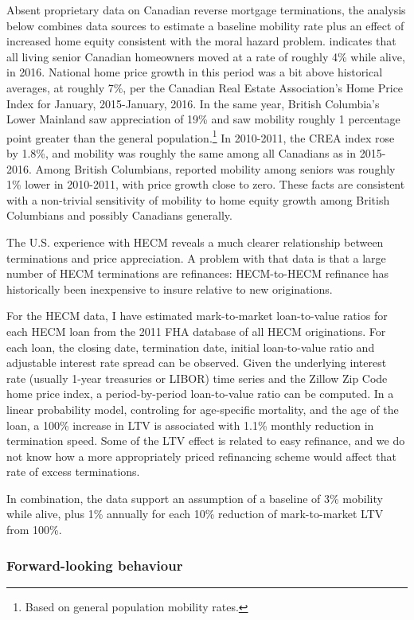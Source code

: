 \documentclass[12pt]{article}
\begin{document}
Absent proprietary data on Canadian reverse mortgage terminations, the analysis
below combines data sources to estimate a baseline mobility rate plus an effect
of increased home equity consistent with the moral hazard problem.
\textcite{HousingNeeds} indicates that all living senior Canadian homeowners
moved at a rate of roughly 4\% while alive, in 2016. National home price growth
in this period was a bit above historical averages, at roughly 7\%, per the
Canadian Real Estate Association's Home Price Index for January, 2015-January,
2016. In the same year, British Columbia's Lower Mainland saw appreciation of
19\% and saw mobility roughly 1 percentage point greater than the general
population.\footnote{Based on general population mobility rates.} In 2010-2011,
the CREA index rose by 1.8\%, and mobility was roughly the same among all
Canadians as in 2015-2016. Among British Columbians, reported mobility among
seniors was roughly 1\% lower in 2010-2011, with price growth close to zero.
These facts are consistent with a non-trivial sensitivity of mobility to home
equity growth among British Columbians and possibly Canadians generally.
 
The U.S. experience with HECM reveals a much clearer relationship between
terminations and price appreciation. A problem with that data is that a large
number of HECM terminations are refinances: HECM-to-HECM refinance has
historically been inexpensive to insure relative to new originations.

For the HECM data, I have estimated mark-to-market loan-to-value ratios for
each HECM loan from the 2011 FHA database of all HECM originations. For each
loan, the closing date, termination date, initial loan-to-value ratio and
adjustable interest rate spread can be observed. Given the underlying interest
rate (usually 1-year treasuries or LIBOR) time series and the Zillow Zip Code
home price index, a period-by-period loan-to-value ratio can be computed. In a
linear probability model, controling for age-specific mortality, and the age of
the loan, a 100\% increase in LTV is associated with 1.1\% monthly reduction in
termination speed. Some of the LTV effect is related to easy refinance, and we
do not know how a more appropriately priced refinancing scheme would affect
that rate of excess terminations.

In combination, the data support an assumption of a baseline of 3\% mobility
while alive, plus 1\% annually for each 10\% reduction of mark-to-market LTV
from 100\%.

\subsubsection{Forward-looking behaviour}
\end{document}

